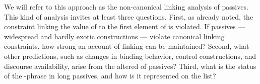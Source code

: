 \documentclass[output=paper
                ,modfonts
                ,nonflat
	        ,collection
	        ,collectionchapter
	        ,collectiontoclongg
 	        ,biblatex
                ,babelshorthands
                ,newtxmath
                ,draftmode
                ,colorlinks, citecolor=brown
]{./langsci/langscibook}
\begin{document}

 \ea
\label{pass-lr}
 

\z
We will refer to this approach as the non-canonical linking analysis of passives. This kind of analysis invites at least three questions.
First, as already noted, the constraint linking the value of  to the first element of \argst is violated.
If passives --- widespread and hardly exotic constructions --- violate canonical linking constraints, how strong an account of linking can be maintained?
Second, what other predictions, such as changes in binding behavior, control constructions, and discourse availability, arise from the altered \argst of passives?
Third, what is the status of the -phrase in long passives, and how is it represented on the \argst list?
\end{document}
